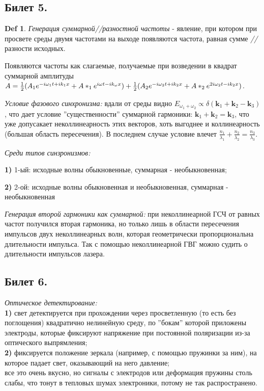 \documentclass[a4paper,12pt]{article}
\theoremstyle{definition} %
\theoremstyle{definition} %
\newtheorem{Def}{Def}[section]
\theoremstyle{remark} %
\begin{document}
\subsection{Билет 5.}

\begin{Def}
	\textit{Генерация суммарной//разностной частоты} - явление, при котором при просвете среды двумя частотами на выходе появляются частота, равная сумме \textit{//} разности исходных.
\end{Def}

	Появляются частоты как слагаемые, получаемые при возведении в квадрат суммарной амплитуды $A = \frac{1}{2} (A_{1}e^{-i\omega_{1} t +i k_{1}x} + A*_{1}e^{i\omega t -i k_{\omega}x}) + \\ \frac{1}{2} (A_{2}e^{-i\omega_{2} t +i k_{2}x} + A*_{2}e^{2i\omega_{2} t -i k_{2}x})$.


	\textit{Условие фазового синхронизма:} вдали от среды видно $E_{\omega_{1}+\omega_{2}} \propto \delta(\mathbf{k}_{1}+\mathbf{k}_{2}-\mathbf{k}_{3})$, что дает условие ''существенности'' суммарной гармоники: $\mathbf{k}_{1}+\mathbf{k}_{2}=\mathbf{k}_{3}$, что уже допусакает неколлинеарность этих векторов, хоть выгоднее и коллинеарность (большая область пересечения). В последнем случае условие влечет $\frac{n_{1}}{\lambda_{1}}+\frac{n_{2}}{\lambda_{2}}=\frac{n_{3}}{\lambda_{3}}$.


	\textit{Среди типов синзронизмов:} \\
	\par \textbf{1)} 1-ый: исходные волны обыкновенные, суммарная - необыкновенная;\\
	\par \textbf{2)} 2-ой: исходные волны обыкновенная и необыкновенная, суммарная - необыкновенная


	\textit{Генерация второй гармоники как суммарной:} при неколлинеарной ГСЧ от равных частот получился вторая гармоника, но только лишь в области пересечения импульсов двух неколлинеарных волн, которая геометрически пропорциональна длительности импульса. Так с помощью неколлинеарной ГВГ можно судить о длительности импульсов лазера.


\subsection{Билет 6.}


	\textit{Оптическое детектирование:} \\
	\textbf{1)} свет детектируется при прохождении через просветленную (то есть без поглощения) квадратично нелинейную среду, по ''бокам'' которой приложены электроды, которые фиксируют напряжение при постоянной поляризации из-за оптического выпрямления; \\
	\textbf{2)} фиксируется положение зеркала (например, с помощью пружинки за ним), на которое падает свет, оказывающий на него давление; \\
	все это очень вкусно, но сигналы с электродов или деформация пружины столь слабы, что тонут в тепловых шумах электроники, потому не так распространено.
\end{document}
